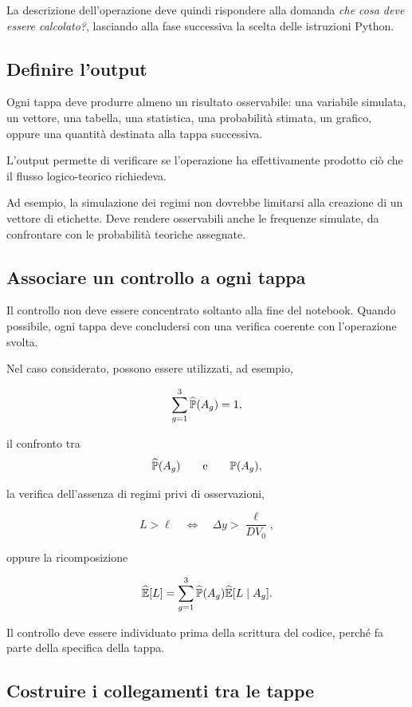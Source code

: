 La descrizione dell'operazione deve quindi rispondere alla domanda
\emph{che cosa deve essere calcolato?}, lasciando alla fase successiva la
scelta delle istruzioni Python.

\subsection{Definire l'output}

Ogni tappa deve produrre almeno un risultato osservabile: una variabile
simulata, un vettore, una tabella, una statistica, una probabilit\`{a} stimata,
un grafico, oppure una quantit\`{a} destinata alla tappa successiva.

L'output permette di verificare se l'operazione ha effettivamente prodotto
ci\`{o} che il flusso logico-teorico richiedeva.

Ad esempio, la simulazione dei regimi non dovrebbe limitarsi alla creazione di
un vettore di etichette. Deve rendere osservabili anche le frequenze simulate,
da confrontare con le probabilit\`{a} teoriche assegnate.

\subsection{Associare un controllo a ogni tappa}

Il controllo non deve essere concentrato soltanto alla fine del notebook.
Quando possibile, ogni tappa deve concludersi con una verifica coerente con
l'operazione svolta.

Nel caso considerato, possono essere utilizzati, ad esempio,

\[
\sum_{g=1}^{3}\widehat{\mathbb{P}}(A_g)=1,
\]

\noindent il confronto tra
\[
\widehat{\mathbb{P}}(A_g)
\qquad\text{e}\qquad
\mathbb{P}(A_g),
\]

\noindent la verifica dell'assenza di regimi privi di osservazioni,

\[
L>\ell
\quad\Longleftrightarrow\quad
\Delta y>\frac{\ell}{D V_0},
\]

\noindent oppure la ricomposizione

\[
\widehat{\mathbb{E}}[L]
=
\sum_{g=1}^{3}
\widehat{\mathbb{P}}(A_g)
\widehat{\mathbb{E}}[L\mid A_g].
\]

Il controllo deve essere individuato prima della scrittura del codice, perch\'{e}
fa parte della specifica della tappa.

\subsection{Costruire i collegamenti tra le tappe}


